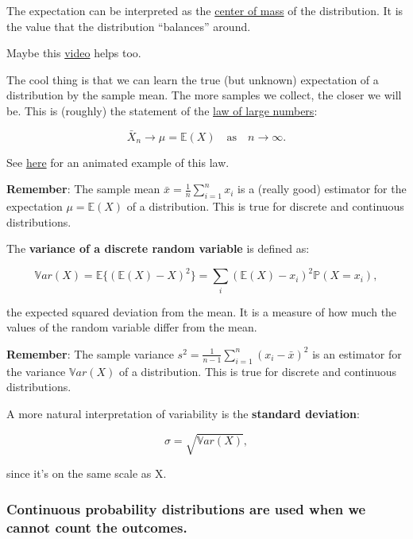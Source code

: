 \documentclass[
]{book}
\begin{document}
The expectation can be interpreted as the \href{https://mathcenter.oxford.emory.edu/site/math117/expectedValueAndCenterOfMass/}{center of mass}
of the distribution. It is the value that the distribution ``balances'' around.

Maybe this \href{https://www.youtube.com/watch?v=KLs_7b7SKi4}{video} helps too.

The cool thing is that we can learn the true (but unknown) expectation of a distribution by the sample mean. The more samples we collect, the closer we will be.
This is (roughly) the statement of the \href{https://en.wikipedia.org/wiki/Law_of_large_numbers}{law of large numbers}:

\[\bar{X}_n \rightarrow \mu = \mathbb{E}(X) \quad \text{as} \quad n \rightarrow \infty.\]

See \href{https://github.com/jdegenfellner/ZHAW_Teaching/blob/main/Law_of_Large_Numbers_Dice_animation.R}{here} for an animated example of this law.

\textbf{Remember}: The sample mean \(\bar{x} = \frac{1}{n} \sum_{i=1}^n x_i\) is a (really good) estimator for the expectation \(\mu = \mathbb{E}(X)\) of a distribution.
This is true for discrete and continuous distributions.

The \textbf{variance of a discrete random variable} is defined as:

\[\mathbb{V}ar(X) = \mathbb{E} \{ (\mathbb{E}(X) - X)^2 \} = \sum_i (\mathbb{E}(X) - x_i)^2 \mathbb{P}(X = x_i),\]

the expected squared deviation from the mean. It is a measure of how much the values of the random variable differ from the mean.

\textbf{Remember}: The sample variance \(s^2 = \frac{1}{n-1} \sum_{i=1}^n (x_i - \bar{x})^2\) is an estimator for the variance \(\mathbb{V}ar(X)\) of a distribution.
This is true for discrete and continuous distributions.

A more natural interpretation of variability is the \textbf{standard deviation}:

\[\sigma = \sqrt{\mathbb{V}ar(X)},\]

since it's on the same scale as X.

\subsubsection{Continuous probability distributions are used when we cannot count the outcomes.}\label{continuous_probability_distributions}
\end{document}
